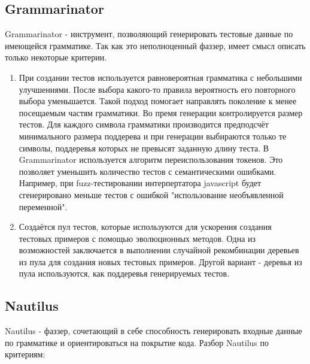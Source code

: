 \documentclass[a4paper]{article}
\begin{document}
\subsection{Grammarinator}
\indent

Grammarinator\cite{litlink5} - инструмент, позволяющий генерировать тестовые данные по имеющейся грамматике. Так как это неполноценный фаззер, имеет смысл описать только некоторые критерии.

\begin{enumerate}
\item При создании тестов используется равновероятная грамматика с небольшими улучшениями. После выбора какого-то правила вероятность его повторного выбора уменьшается. Такой подход помогает направлять
поколение к менее посещаемым частям грамматики. Во премя генерации контролируется размер тестов. Для каждого символа грамматики производится предподсчёт минимального размера поддерева и при генерации выбираются только те символы, поддеревья которых не превысят заданную длину теста. В Grammarinator используется алгоритм переиспользования токенов. Это позволяет уменьшить количество тестов с семантическими ошибками. Например, при fuzz-тестировании интерпертатора javascript будет сгенерировано меньше тестов с ошибкой "использование необъявленной переменной".
\item Создаётся пул тестов, которые используются для ускорения создания тестовых примеров с помощью эволюционных методов. Одна из возможностей заключается в выполнении случайной рекомбинации деревьев из пула для создания новых тестовых примеров. Другой вариант - деревья из пула используются, как поддеревья генерируемых тестов.
\end{enumerate}


\subsection{Nautilus}
\indent
Nautilus\cite{litlink6} - фаззер, сочетающий в себе способность генерировать входные данные по грамматике и ориентироваться на покрытие кода. Разбор Nautilus по критериям:
\end{document}
